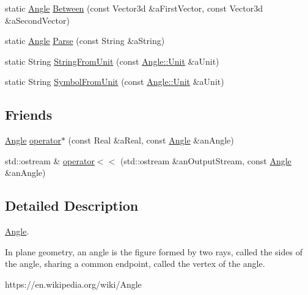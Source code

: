 \begin{DoxyCompactItemize}
\item 
static \hyperlink{classostk_1_1math_1_1geom_1_1_angle}{Angle} \hyperlink{classostk_1_1math_1_1geom_1_1_angle_a6f7ddfc10e30a40b6af7ede9709f8d68}{Between} (const Vector3d \&a\+First\+Vector, const Vector3d \&a\+Second\+Vector)
\item 
static \hyperlink{classostk_1_1math_1_1geom_1_1_angle}{Angle} \hyperlink{classostk_1_1math_1_1geom_1_1_angle_ab8a02704715f4110eb592aa42430a5ab}{Parse} (const String \&a\+String)
\item 
static String \hyperlink{classostk_1_1math_1_1geom_1_1_angle_a168262fde30e93d20d1ebc092d6c7cea}{String\+From\+Unit} (const \hyperlink{classostk_1_1math_1_1geom_1_1_angle_abb73526d3f7f94a3b33e8358e1b18027}{Angle\+::\+Unit} \&a\+Unit)
\item 
static String \hyperlink{classostk_1_1math_1_1geom_1_1_angle_a38e728610d9948d4a492db7e018a6759}{Symbol\+From\+Unit} (const \hyperlink{classostk_1_1math_1_1geom_1_1_angle_abb73526d3f7f94a3b33e8358e1b18027}{Angle\+::\+Unit} \&a\+Unit)
\end{DoxyCompactItemize}
\subsection*{Friends}
\begin{DoxyCompactItemize}
\item 
\hyperlink{classostk_1_1math_1_1geom_1_1_angle}{Angle} \hyperlink{classostk_1_1math_1_1geom_1_1_angle_af699984b24759466957ecddaa7e61fc9}{operator$\ast$} (const Real \&a\+Real, const \hyperlink{classostk_1_1math_1_1geom_1_1_angle}{Angle} \&an\+Angle)
\item 
std\+::ostream \& \hyperlink{classostk_1_1math_1_1geom_1_1_angle_a0846b77ee3281e8a559197c3c3208eed}{operator$<$$<$} (std\+::ostream \&an\+Output\+Stream, const \hyperlink{classostk_1_1math_1_1geom_1_1_angle}{Angle} \&an\+Angle)
\end{DoxyCompactItemize}


\subsection{Detailed Description}
\hyperlink{classostk_1_1math_1_1geom_1_1_angle}{Angle}. 

In plane geometry, an angle is the figure formed by two rays, called the sides of the angle, sharing a common endpoint, called the vertex of the angle.

https\+://en.wikipedia.\+org/wiki/\+Angle 

